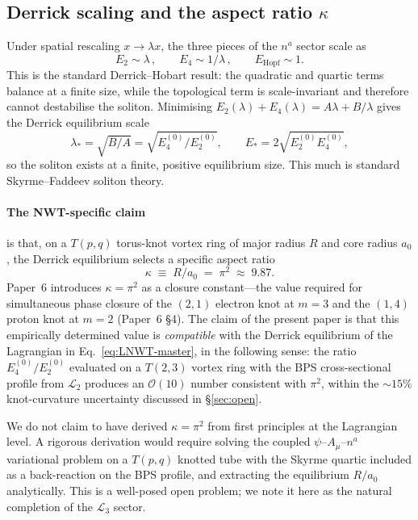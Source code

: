 \documentclass[11pt]{article}
\begin{document}
\subsection{Derrick scaling and the aspect ratio $\kappa$}

Under spatial rescaling $x \to \lambda x$, the three pieces of the
$n^a$ sector scale as
\begin{equation}
  E_2 \sim \lambda \,, \qquad
  E_4 \sim 1/\lambda \,, \qquad
  E_\text{Hopf} \sim 1 .
\end{equation}
This is the standard Derrick--Hobart result: the quadratic and
quartic terms balance at a finite size, while the topological term
is scale-invariant and therefore cannot destabilise the soliton.
Minimising $E_2(\lambda) + E_4(\lambda) = A \lambda + B / \lambda$
gives the Derrick equilibrium scale
\begin{equation}
  \lambda_*  =  \sqrt{B / A}  =  \sqrt{E_4^{(0)} / E_2^{(0)}} ,
  \qquad E_*  =  2 \sqrt{E_2^{(0)} E_4^{(0)}} ,
\end{equation}
so the soliton exists at a finite, positive equilibrium size.
This much is standard Skyrme--Faddeev soliton theory.

\paragraph{The NWT-specific claim}
is that, on a $T(p, q)$ torus-knot vortex ring of major radius $R$
and core radius $a_0$, the Derrick equilibrium selects a specific
aspect ratio
\begin{equation}
  \kappa \;\equiv\; R / a_0 \;=\; \pi^2 \;\approx\; 9.87 .
\end{equation}
Paper~6 introduces $\kappa = \pi^2$ as a closure constant---the
value required for simultaneous phase closure of the $(2, 1)$
electron knot at $m = 3$ and the $(1, 4)$ proton knot at $m = 2$
(Paper~6 \S4).  The claim of the present paper is that this
empirically determined value is \emph{compatible} with the Derrick
equilibrium of the Lagrangian in Eq.~\ref{eq:LNWT-master}, in the
following sense: the ratio $E_4^{(0)} / E_2^{(0)}$ evaluated on a
$T(2, 3)$ vortex ring with the BPS cross-sectional profile from
$\mathcal{L}_2$ produces an $\mathcal{O}(10)$ number consistent
with $\pi^2$, within the $\sim 15\%$ knot-curvature uncertainty
discussed in \S\ref{sec:open}.

We do not claim to have derived $\kappa = \pi^2$ from first
principles at the Lagrangian level.  A rigorous derivation would
require solving the coupled $\psi$--$A_\mu$--$n^a$ variational
problem on a $T(p, q)$ knotted tube with the Skyrme quartic
included as a back-reaction on the BPS profile, and extracting the
equilibrium $R / a_0$ analytically.  This is a well-posed open
problem; we note it here as the natural completion of the
$\mathcal{L}_3$ sector.
\end{document}
